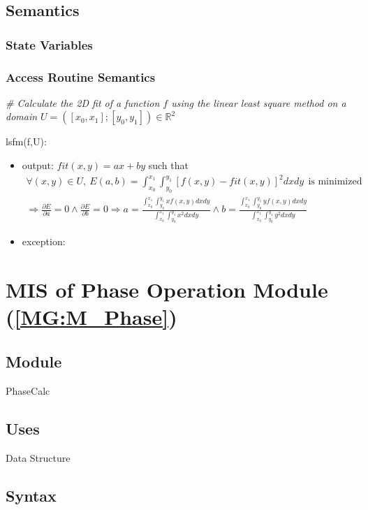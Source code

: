 \documentclass[12pt, titlepage]{article}
\begin{document}
\subsection{Semantics}

\subsubsection{State Variables}


\subsubsection{Access Routine Semantics}

\noindent\textit{{\#} Calculate the 2D fit of a function $f$ using the linear least square method on a domain $U=([x_0,x_1];[y_0,y_1]) \in \mathbb{R}^2$} \medskip

\noindent lsfm(f,U):
\begin{itemize}
\item output: $fit(x,y)=ax + by$ such that
\begin{equation*}
\begin{gathered}
\forall (x,y) \in U, \ E(a,b)=\int_{x_0}^{x_1}\int_{y_0}^{y_1}[f(x,y)-fit(x,y)]^2dxdy \ \ \text{is minimized} \\
\Rightarrow \frac{\partial E}{\partial a} =0 \wedge \frac{\partial E}{\partial b} =0
\Rightarrow a = \frac{\int_{x_0}^{x_1}\int_{y_0}^{y_1}xf(x,y)dxdy}{\int_{x_0}^{x_1}\int_{y_0}^{y_1}x^2dxdy} \wedge  b= \frac{\int_{x_0}^{x_1}\int_{y_0}^{y_1}yf(x,y)dxdy}{\int_{x_0}^{x_1}\int_{y_0}^{y_1}y^2dxdy}
\end{gathered}
\end{equation*}
\item exception:  
\end{itemize}


\section{MIS of Phase Operation Module (\texorpdfstring{\cref{MG:M_Phase}}))} \label{MIS_Phase}

\subsection{Module}
PhaseCalc
\subsection{Uses}
Data Structure
\subsection{Syntax}
\end{document}
